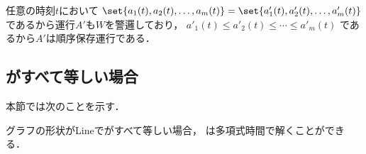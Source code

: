 任意の時刻$t$において
$\set{ a_1(t), a_2(t), \ldots, a_m(t) } = \set{ a'_1(t), a'_2(t), \ldots, a'_m(t) }$
であるから運行$A'$も$W$を警邏しており，
%
$a'_1(t) \leq a'_2(t) \leq \cdots \leq a'_m(t)$
であるから$A'$は順序保存運行である．







\subsection{{\timelimit}がすべて等しい場合}
\label{subsec:LineUnaryTimelimit}




本節では次のことを示す．

\begin{theo}
	\label{theo:LineEqualTimelimit}
	グラフの形状がLineで{\timelimit}がすべて等しい場合，
	{\patrolling}は多項式時間で解くことができる．
\end{theo}





